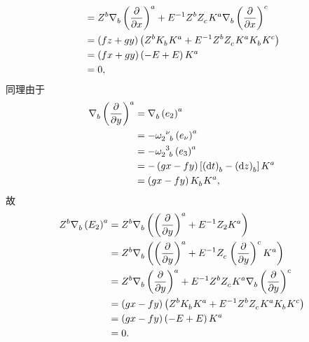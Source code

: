 \begin{xiti}
\begin{zm}
\begin{enumerate}[label=(\arabic*)]
\begin{equation*}
\begin{split}
						&= \tensor{Z}{^b} \Nabla{b} \tensor{\left( \pdv{x} \right)}{^a} + E^{-1} \tensor{Z}{^b} \tensor{Z}{_c} \tensor{K}{^a} \Nabla{b} \tensor{\left( \pdv{x} \right)}{^c}\\
						&= \left( fz+gy \right) \left( \tensor{Z}{^b} \tensor{K}{_b} \tensor{K}{^a} + E^{-1} \tensor{Z}{^b} \tensor{Z}{_c} \tensor{K}{^a} \tensor{K}{_b} \tensor{K}{^c} \right)\\
						&= \left( fx+gy \right) \left( - E + E \right) \tensor{K}{^a}\\
						&= 0,
					\end{split}
				\end{equation*}
				同理由于
				\begin{equation*}
					\begin{split}
						\Nabla{b} \tensor{\left( \pdv{y} \right)}{^a} &= \Nabla{b} \tensor{\left( e_2 \right)}{^a}\\
						&= - \tensor{\omega}{_2^\nu_b} \tensor{\left( e_\nu \right)}{^a}\\
						&= - \tensor{\omega}{_2^3_b} \tensor{\left( e_3 \right)}{^a}\\
						&= - \left( gx-fy \right) \left[ \tensor{\left( \dd{t} \right)}{_b} - \tensor{\left( \dd{z} \right)}{_b} \right] \tensor{K}{^a}\\
						&= \left( gx-fy \right) \tensor{K}{_b} \tensor{K}{^a},
					\end{split}
				\end{equation*}
				故
				\begin{equation*}
					\begin{split}
						\tensor{Z}{^b} \Nabla{b} \tensor{\left( E_2 \right)}{^a} &= \tensor{Z}{^b} \Nabla{b} \left( \tensor{\left( \pdv{y} \right)}{^a} + E^{-1} Z_2 \tensor{K}{^a} \right)\\
						&= \tensor{Z}{^b} \Nabla{b} \left( \tensor{\left( \pdv{y} \right)}{^a} + E^{-1} \tensor{Z}{_c} \tensor{\left( \pdv{y} \right)}{^c} \tensor{K}{^a} \right)\\
						&= \tensor{Z}{^b} \Nabla{b} \tensor{\left( \pdv{y} \right)}{^a} + E^{-1} \tensor{Z}{^b} \tensor{Z}{_c} \tensor{K}{^a} \Nabla{b} \tensor{\left( \pdv{y} \right)}{^c}\\
						&= \left( gx-fy \right) \left( \tensor{Z}{^b} \tensor{K}{_b} \tensor{K}{^a} + E^{-1} \tensor{Z}{^b} \tensor{Z}{_c} \tensor{K}{^a} \tensor{K}{_b} \tensor{K}{^c} \right)\\
						&= \left( gx-fy \right) \left( - E + E \right) \tensor{K}{^a}\\
						&= 0.
					\end{split}
				\end{equation*}
			\end{enumerate}
		\end{zm}
\end{xiti}